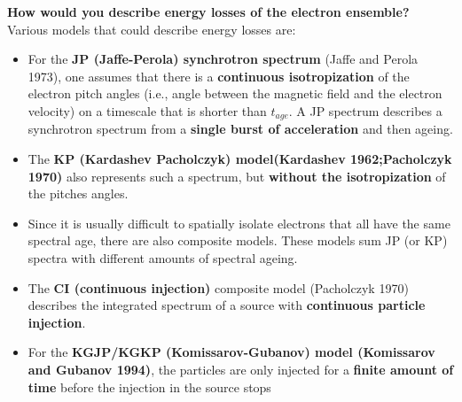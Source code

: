 \documentclass[12pt]{report}
\newcommand{\tbf}[1]{\textbf{#1}}
\begin{document}
 \textbf{How would you describe energy losses of the electron ensemble?}\\
 Various models that could describe energy losses are:
 \begin{itemize}
 \item For the \tbf{JP (Jaffe-Perola) synchrotron spectrum} (Jaffe and Perola 1973), one assumes that there is a \tbf{continuous isotropization} of the electron pitch angles (i.e., angle between the magnetic field and the electron velocity) on a timescale that is shorter than $t_{age}$. A JP spectrum describes a synchrotron spectrum from a \tbf{single burst of acceleration} and then ageing.
 
 \item  The \tbf{KP (Kardashev Pacholczyk) model(Kardashev 1962;Pacholczyk 1970)} also represents such a spectrum, but \tbf{without the isotropization} of the pitches angles. 
 \item  Since it is usually difficult to spatially isolate electrons that all have the same spectral age, there are also composite models. These models sum JP (or KP) spectra with different amounts of spectral ageing.
 
 \item The \tbf{CI (continuous injection)} composite model (Pacholczyk 1970) describes the integrated spectrum of a source with \tbf{continuous particle injection}.
 \item  For the \tbf{KGJP/KGKP (Komissarov-Gubanov) model (Komissarov and Gubanov 1994)}, the particles are only injected for a \tbf{finite amount of time} before the injection in the source stops
 \end{itemize}
\end{document}
